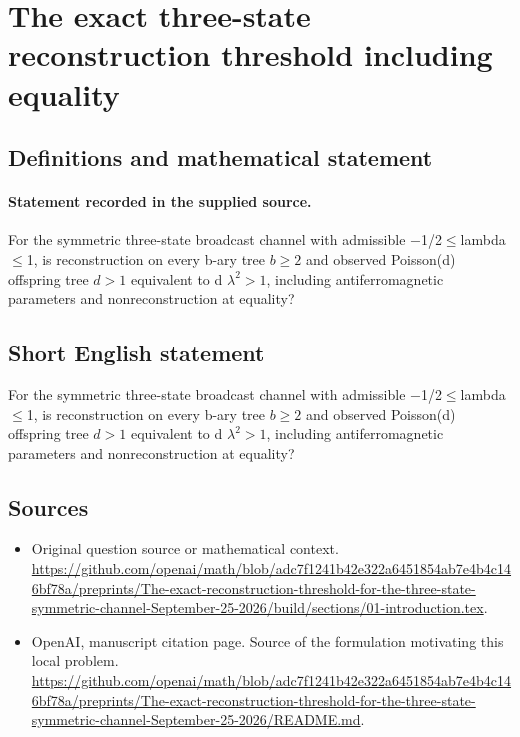 \documentclass[11pt]{article}
\begin{document}
\section*{The exact three-state reconstruction threshold including equality}\label{statement}
\subsection{Definitions and mathematical statement}
\paragraph{Statement recorded in the supplied source.}
For the symmetric three-state broadcast channel with admissible $-$1/2$\leq$lambda$\leq$1, is reconstruction on every b-ary tree $b\geq 2$ and observed Poisson(d) offspring tree $d>1$ equivalent to d $\lambda ^2>1$, including antiferromagnetic parameters and nonreconstruction at equality?
\subsection{Short English statement}
For the symmetric three-state broadcast channel with admissible $-$1/2$\leq$lambda$\leq$1, is reconstruction on every b-ary tree $b\geq 2$ and observed Poisson(d) offspring tree $d>1$ equivalent to d $\lambda ^2>1$, including antiferromagnetic parameters and nonreconstruction at equality?
\subsection{Sources}
\begin{itemize}
\item[S1] Original question source or mathematical context.
\url{https://github.com/openai/math/blob/adc7f1241b42e322a6451854ab7e4b4c146bf78a/preprints/The-exact-reconstruction-threshold-for-the-three-state-symmetric-channel-September-25-2026/build/sections/01-introduction.tex}.
\item[S2] OpenAI, manuscript citation page. Source of the formulation motivating this local problem.
\url{https://github.com/openai/math/blob/adc7f1241b42e322a6451854ab7e4b4c146bf78a/preprints/The-exact-reconstruction-threshold-for-the-three-state-symmetric-channel-September-25-2026/README.md}.
\end{itemize}
\end{document}
